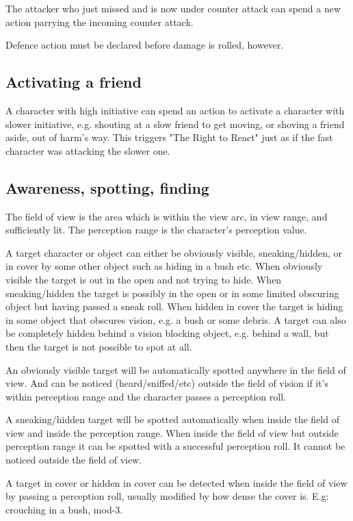 The attacker who just missed and is now under counter attack can spend a new action parrying the incoming counter attack.

Defence action must be declared before damage is rolled, however.


\subsection*{Activating a friend}
A character with high initiative can spend an action to activate a character with slower initiative, e.g. shouting at a slow friend to get moving, or shoving a friend aside, out of harm's way. This triggers "The Right to React" just as if the fast character was attacking the slower one.


\subsection*{Awareness, spotting, finding}
The field of view is the area which is within the view arc, in view range, and sufficiently lit. The perception range is the character's perception value.

A target character or object can either be obviously visible, sneaking/hidden, or in cover by some other object such as hiding in a bush etc. When obviously visible the target is out in the open and not trying to hide. When sneaking/hidden the target is possibly in the open or in some limited obscuring object but having passed a sneak roll. When hidden in cover the target is hiding in some object that obscures vision, e.g. a bush or some debris. A target can also be completely hidden behind a vision blocking object, e.g. behind a wall, but then the target is not possible to spot at all.

An obviously visible target will be automatically spotted anywhere in the field of view. And can be noticed (heard/sniffed/etc) outside the field of vision if it's within perception range and the character passes a perception roll.

A sneaking/hidden target will be spotted automatically when inside the field of view and inside the perception range. When inside the field of view but outside perception range it can be spotted with a successful perception roll. It cannot be noticed outside the field of view.

A target in cover or hidden in cover can be detected when inside the field of view by passing a perception roll, usually modified by how dense the cover is. E.g: crouching in a bush, mod-3.

